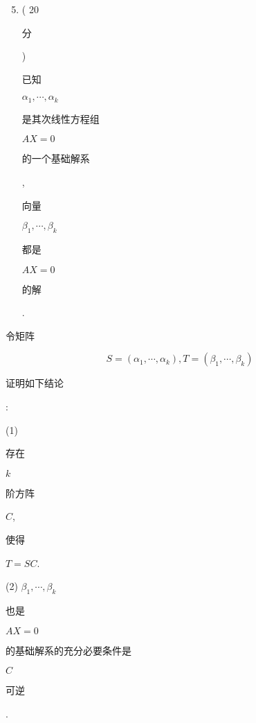 \documentclass[10pt]{article}
\begin{document}
\begin{enumerate}
  \setcounter{enumi}{4}
  \item ( 20 \begin{CJK}{UTF8}{mj}分\end{CJK}) \begin{CJK}{UTF8}{mj}已知\end{CJK} $\alpha_{1}, \cdots, \alpha_{k}$ \begin{CJK}{UTF8}{mj}是其次线性方程组\end{CJK} $A X=0$ \begin{CJK}{UTF8}{mj}的一个基础解系\end{CJK}, \begin{CJK}{UTF8}{mj}向量\end{CJK} $\beta_{1}, \cdots, \beta_{k}$ \begin{CJK}{UTF8}{mj}都是\end{CJK} $A X=0$ \begin{CJK}{UTF8}{mj}的解\end{CJK}.
\end{enumerate}
\begin{CJK}{UTF8}{mj}令矩阵\end{CJK}
$$
S=\left(\alpha_{1}, \cdots, \alpha_{k}\right), T=\left(\beta_{1}, \cdots, \beta_{k}\right)
$$
\begin{CJK}{UTF8}{mj}证明如下结论\end{CJK}:

(1) \begin{CJK}{UTF8}{mj}存在\end{CJK} $k$ \begin{CJK}{UTF8}{mj}阶方阵\end{CJK} $C$, \begin{CJK}{UTF8}{mj}使得\end{CJK} $T=S C$.

(2) $\beta_{1}, \cdots, \beta_{k}$ \begin{CJK}{UTF8}{mj}也是\end{CJK} $A X=0$ \begin{CJK}{UTF8}{mj}的基础解系的充分必要条件是\end{CJK} $C$ \begin{CJK}{UTF8}{mj}可逆\end{CJK}.
\end{document}
